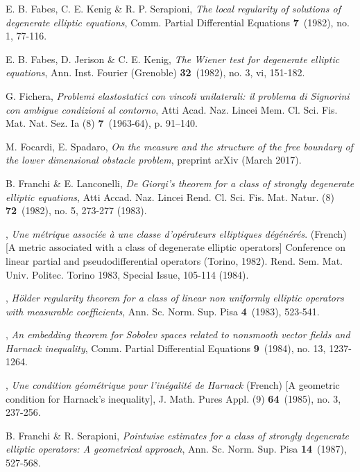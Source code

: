 \documentclass[11pt]{amsart}
\theoremstyle{plain}
\numberwithin{equation}{section}
\begin{document}
\begin{thebibliography}{99}
E. B. Fabes, C. E. Kenig \& R. P. Serapioni, \emph{The local regularity of solutions of degenerate elliptic equations}, Comm. Partial Differential Equations \textbf{7}~(1982), no. 1, 77-116.

E. B. Fabes, D. Jerison \& C. E. Kenig, \emph{The Wiener test for degenerate elliptic equations}, Ann. Inst. Fourier (Grenoble) \textbf{32}~(1982), no. 3, vi, 151-182.

G. Fichera, \emph{Problemi elastostatici con vincoli unilaterali: il problema di Signorini con ambigue condizioni al contorno}, Atti Acad. Naz. Lincei Mem. Cl. Sci. Fis. Mat. Nat. Sez. Ia (8) \textbf{7}~(1963-64), p. 91--140.

M. Focardi, E. Spadaro, \emph{On the measure and the structure of the free boundary of the lower dimensional obstacle problem}, 
preprint arXiv (March 2017).

B. Franchi \& E. Lanconelli, \emph{De Giorgi's theorem for a class of strongly degenerate elliptic equations}, Atti Accad. Naz. Lincei Rend. Cl. Sci. Fis. Mat. Natur. (8) \textbf{72}~(1982), no. 5, 273-277 (1983).

\bysame, \emph{Une m\'etrique associ\'ee \`a une classe d'op\'erateurs elliptiques d\'eg\'en\'er\'es}. (French) [A metric associated with a class of degenerate elliptic operators] Conference on linear partial and pseudodifferential operators (Torino, 1982). Rend. Sem. Mat. Univ. Politec. Torino 1983, Special Issue, 105-114 (1984).

\bysame, \emph{H\"older regularity theorem for a class of linear non
uniformly elliptic operators with measurable coefficients}, Ann. Sc. Norm. Sup. Pisa
\textbf{4}~(1983), 523-541.

\bysame, \emph{An embedding theorem for Sobolev spaces related to nonsmooth vector fields and Harnack inequality}, Comm. Partial Differential Equations \textbf{9}~(1984), no. 13, 1237-1264.

\bysame, \emph{Une condition g\'eom\'etrique pour l'in\'egalit\'e de Harnack} (French) [A geometric condition for Harnack's inequality], J. Math. Pures Appl. (9) \textbf{64}~(1985), no. 3, 237-256.

B. Franchi \& R. Serapioni, \emph{Pointwise estimates for a class of strongly degenerate
elliptic operators: A geometrical approach}, Ann. Sc. Norm. Sup. Pisa \textbf{14}~(1987), 527-568.


\end{thebibliography}
\end{document}

